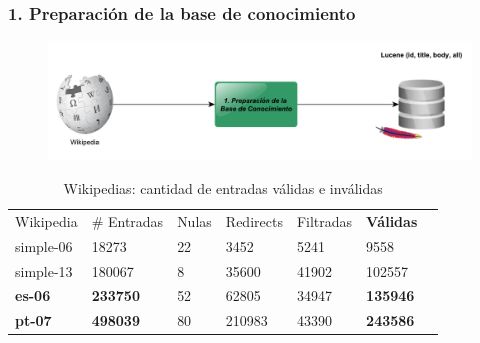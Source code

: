 \begin{frame}
\frametitle{1. Preparación de la base de conocimiento}
  \begin{figure}
      \includegraphics[scale=0.33]{graficos/pipeline-ibp}
  \end{figure}
    \begin{table}
    \centering
    \begin{center}
    \begin{tabular}{| l | l | l | l | l | l| l|}
    Wikipedia & \# Entradas & Nulas & Redirects & Filtradas & \textbf{Válidas} \\ 
    simple-06 & 18273 & 22 &  3452 & 5241 & 9558 \\ 
    simple-13 & 180067 & 8 & 35600 & 41902 & 102557\\
    \textbf{es-06} & \textbf{233750} & 52 & 62805 & 34947 & \textbf{{\color{green}135946}} \\ 
    \textbf{pt-07} & \textbf{498039} & 80 & 210983 & 43390 & \textbf{{\color{green}243586}} \\ 
    \end{tabular}
    \caption{Wikipedias: cantidad de entradas válidas e inválidas}
    \label{table:creacion-indices}
    \end{center}
    \end{table}
\end{frame}



